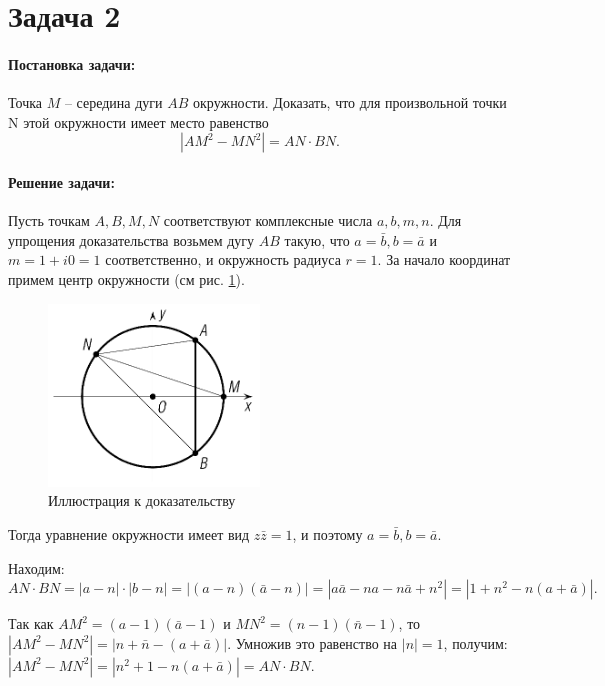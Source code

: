 {
   \section*{Задача 2}
   \paragraph{Постановка задачи:}
   Точка \(M\) -- середина дуги \(AB\) окружности. Доказать, что для произвольной точки N этой окружности имеет место
   равенство
   \begin{equation}
      \left\lvert AM^2-MN^2 \right\rvert = AN \cdot BN.
      \label{t2:f1}
   \end{equation}
   \paragraph{Решение задачи:}
   Пусть точкам \(A,B,M,N\) соответствуют комплексные числа \(a,b,m,n\). Для упрощения доказательства возьмем дугу \(AB\) такую, что \(a = \bar{b},b = \bar{a}\) и \(m = 1 + i0 = 1\) соответственно, и окружность радиуса \(r = 1\). За начало координат примем центр окружности (см рис. \ref{t2:im}).
   \begin{figure}[h]
      \centering
      \includegraphics[width=0.5\textwidth]{images/task2.png}
      \caption{Иллюстрация к доказательству}
      \label{t2:im}
   \end{figure}
   Тогда уравнение окружности имеет
   вид \(z \bar{z}=1\), и поэтому \(a=\bar{b}, b=\bar{a}\).

   Находим:
   \(AN \cdot BN = \left\lvert a-n \right\rvert \cdot \left\lvert b-n \right\rvert
   = \left\lvert (a-n)(\bar{a}-n)\right\rvert
   = \left\lvert a\bar{a} - na - n\bar{a} + n^2 \right\rvert
   = \left\lvert 1 + n^2 - n(a+\bar{a})\right\rvert.\)

   Так как \(AM^2 =(a-1)(\bar{a}-1)\) и \(MN^2 =(n-1)(\bar{n}-1)\), то \(\left\lvert AM^2 - MN^2 \right\rvert = \left\lvert n+\bar{n}-(a+\bar{a}) \right\rvert\). Умножив это равенство на \(\left\lvert n \right\rvert=1\), получим:
   \(\left\lvert AM^2 - MN^2 \right\rvert = \left\lvert n^2 +1-n(a+\bar{a})\right\rvert = AN \cdot BN\).
}
